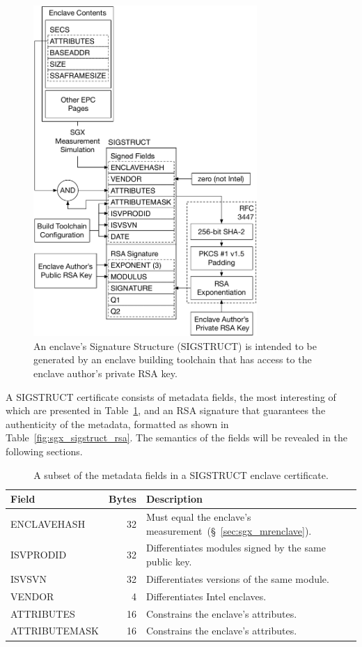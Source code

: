 \begin{figure}[hbt]
  \centering
  \includegraphics[width=85mm]{figures/sgx_sigstruct.pdf}
  \caption{
    An enclave's Signature Structure (SIGSTRUCT) is intended to be generated by
    an enclave building toolchain that has access to the enclave author's
    private RSA key.
  }
  \label{fig:sgx_sigstruct}
\end{figure}

A SIGSTRUCT certificate consists of metadata fields, the most interesting of
which are presented in Table~\ref{fig:sgx_sigstruct_info}, and an RSA
signature that guarantees the authenticity of the metadata, formatted as shown
in Table~\ref{fig:sgx_sigstruct_rsa}. The semantics of the fields will be
revealed in the following sections.

\begin{table}[hbt]
  \centering
  \begin{tabularx}{\columnwidth}{| l | r | X |}
  \hline
  \textbf{Field} & \textbf{Bytes} & \textbf{Description} \\
  \hline
  ENCLAVEHASH & 32 & Must equal the enclave's
                     measurement~(\S~\ref{sec:sgx_mrenclave}). \\
  \hline
  ISVPRODID & 32 & Differentiates modules signed by the same public key. \\
  \hline
  ISVSVN & 32 & Differentiates versions of the same module. \\
  \hline
  VENDOR & 4 & Differentiates Intel enclaves. \\
  \hline
  ATTRIBUTES & 16 & Constrains the enclave's attributes. \\
  \hline
  ATTRIBUTEMASK & 16 & Constrains the enclave's attributes. \\
  \hline
  \end{tabularx}
  \caption{
    A subset of the metadata fields in a SIGSTRUCT enclave certificate.
  }
  \label{fig:sgx_sigstruct_info}
\end{table}

